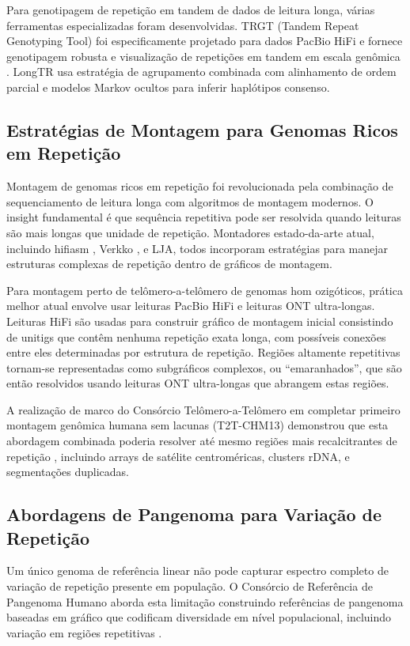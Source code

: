 Para genotipagem de repetição em tandem de dados de leitura longa, várias ferramentas especializadas foram desenvolvidas. TRGT (Tandem Repeat Genotyping Tool) foi especificamente projetado para dados PacBio HiFi e fornece genotipagem robusta e visualização de repetições em tandem em escala genômica \parencite{dolzhenko2024}. LongTR usa estratégia de agrupamento combinada com alinhamento de ordem parcial e modelos Markov ocultos para inferir haplótipos consenso.

\subsection{Estratégias de Montagem para Genomas Ricos em Repetição}

Montagem de genomas ricos em repetição foi revolucionada pela combinação de sequenciamento de leitura longa com algoritmos de montagem modernos. O insight fundamental é que sequência repetitiva pode ser resolvida quando leituras são mais longas que unidade de repetição. Montadores estado-da-arte atual, incluindo hifiasm \parencite{cheng2021}, Verkko \parencite{rautiainen2023}, e LJA, todos incorporam estratégias para manejar estruturas complexas de repetição dentro de gráficos de montagem.

Para montagem perto de telômero-a-telômero de genomas hom ozigóticos, prática melhor atual envolve usar leituras PacBio HiFi e leituras ONT ultra-longas. Leituras HiFi são usadas para construir gráfico de montagem inicial consistindo de unitigs que contêm nenhuma repetição exata longa, com possíveis conexões entre eles determinadas por estrutura de repetição. Regiões altamente repetitivas tornam-se representadas como subgráficos complexos, ou ``emaranhados'', que são então resolvidos usando leituras ONT ultra-longas que abrangem estas regiões.

A realização de marco do Consórcio Telômero-a-Telômero em completar primeiro montagem genômica humana sem lacunas (T2T-CHM13) demonstrou que esta abordagem combinada poderia resolver até mesmo regiões mais recalcitrantes de repetição \parencite{rhie2021b,nurk2022}, incluindo arrays de satélite centroméricas, clusters rDNA, e segmentações duplicadas.

\subsection{Abordagens de Pangenoma para Variação de Repetição}

Um único genoma de referência linear não pode capturar espectro completo de variação de repetição presente em população. O Consórcio de Referência de Pangenoma Humano \parencite{wang2022} aborda esta limitação construindo referências de pangenoma baseadas em gráfico que codificam diversidade em nível populacional, incluindo variação em regiões repetitivas \parencite{liao2023}.

